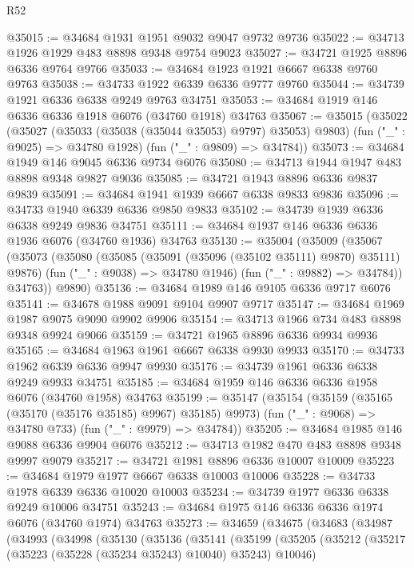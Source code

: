 \begin{lexlean}{R52}
\begin{coremodule}
@35015 := @34684 @1931 @1951 @9032 @9047 @9732 @9736
@35022 := @34713 @1926 @1929 @483 @8898 @9348 @9754 @9023
@35027 := @34721 @1925 @8896 @6336 @9764 @9766
@35033 := @34684 @1923 @1921 @6667 @6338 @9760 @9763
@35038 := @34733 @1922 @6339 @6336 @9777 @9760
@35044 := @34739 @1921 @6336 @6338 @9249 @9763 @34751
@35053 := @34684 @1919 @146 @6336 @6336 @1918 @6076 (@34760 @1918) @34763
@35067 := @35015
    (@35022
      (@35027 (@35033 (@35038 (@35044 @35053) @9797) @35053) @9803)
      (fun ("_" : @9025) => @34780 @1928)
      (fun ("_" : @9809) => @34784))
@35073 := @34684 @1949 @146 @9045 @6336 @9734 @6076
@35080 := @34713 @1944 @1947 @483 @8898 @9348 @9827 @9036
@35085 := @34721 @1943 @8896 @6336 @9837 @9839
@35091 := @34684 @1941 @1939 @6667 @6338 @9833 @9836
@35096 := @34733 @1940 @6339 @6336 @9850 @9833
@35102 := @34739 @1939 @6336 @6338 @9249 @9836 @34751
@35111 := @34684 @1937 @146 @6336 @6336 @1936 @6076 (@34760 @1936) @34763
@35130 := @35004
    (@35009
      (@35067
        (@35073
          (@35080
            (@35085 (@35091 (@35096 (@35102 @35111) @9870) @35111) @9876)
            (fun ("_" : @9038) => @34780 @1946)
            (fun ("_" : @9882) => @34784))
          @34763))
      @9890)
@35136 := @34684 @1989 @146 @9105 @6336 @9717 @6076
@35141 := @34678 @1988 @9091 @9104 @9907 @9717
@35147 := @34684 @1969 @1987 @9075 @9090 @9902 @9906
@35154 := @34713 @1966 @734 @483 @8898 @9348 @9924 @9066
@35159 := @34721 @1965 @8896 @6336 @9934 @9936
@35165 := @34684 @1963 @1961 @6667 @6338 @9930 @9933
@35170 := @34733 @1962 @6339 @6336 @9947 @9930
@35176 := @34739 @1961 @6336 @6338 @9249 @9933 @34751
@35185 := @34684 @1959 @146 @6336 @6336 @1958 @6076 (@34760 @1958) @34763
@35199 := @35147
    (@35154
      (@35159 (@35165 (@35170 (@35176 @35185) @9967) @35185) @9973)
      (fun ("_" : @9068) => @34780 @733)
      (fun ("_" : @9979) => @34784))
@35205 := @34684 @1985 @146 @9088 @6336 @9904 @6076
@35212 := @34713 @1982 @470 @483 @8898 @9348 @9997 @9079
@35217 := @34721 @1981 @8896 @6336 @10007 @10009
@35223 := @34684 @1979 @1977 @6667 @6338 @10003 @10006
@35228 := @34733 @1978 @6339 @6336 @10020 @10003
@35234 := @34739 @1977 @6336 @6338 @9249 @10006 @34751
@35243 := @34684 @1975 @146 @6336 @6336 @1974 @6076 (@34760 @1974) @34763
@35273 := @34659
    (@34675
      (@34683
        (@34987
          (@34993
            (@34998
              (@35130
                (@35136
                  (@35141
                    (@35199
                      (@35205
                        (@35212
                          (@35217 (@35223 (@35228 (@35234 @35243) @10040) @35243) @10046)

\end{coremodule}
\end{lexlean}
